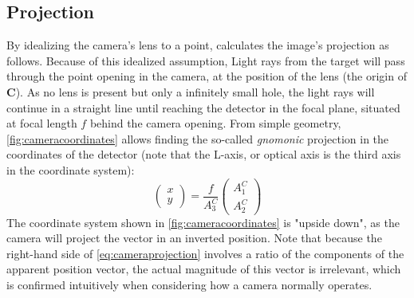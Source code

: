 \subsection{Projection}
By idealizing the camera's lens to a point, \cite{OpNav} calculates the image's projection as follows. Because of this idealized assumption, Light rays from the target will pass through the point opening in the camera, at the position of the lens (the origin of $\mathbf{C}$). As no lens is present but only a infinitely small hole, the light rays will continue in a straight line until reaching the detector in the focal plane, situated at focal length $f$ behind the camera opening. From simple geometry, \autoref{fig:cameracoordinates} allows finding the so-called \textit{gnomonic} projection in the coordinates of the detector (note that the L-axis, or optical axis is the third axis in the coordinate system):
\begin{equation}
    \begin{pmatrix} x \\ y \end{pmatrix} = \frac{f}{A^C_3}\begin{pmatrix}A^C_1 \\ A^C_2\end{pmatrix}
    \label{eq:cameraprojection}
\end{equation}
The coordinate system shown in \autoref{fig:cameracoordinates} is "upside down", as the camera will project the vector in an inverted position. Note that because the right-hand side of \autoref{eq:cameraprojection} involves a ratio of the components of the apparent position vector, the actual magnitude of this vector is irrelevant, which is confirmed intuitively when considering how a camera normally operates.

